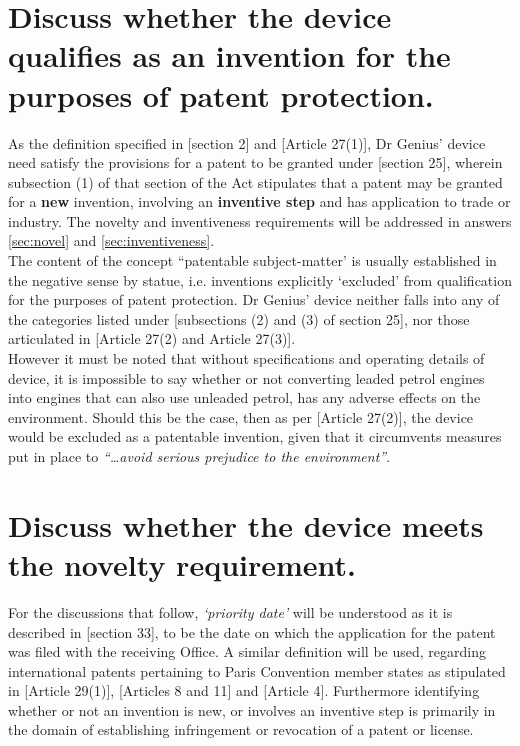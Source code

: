 \documentclass[11pt]{article}
\begin{document}
\section{Discuss whether the device qualifies as an invention for the purposes of patent protection.}
\label{sec:org565e61d}
\label{sec:invention}

As the definition specified in [section 2]\cite{rsa78_patents_act} and [Article 27(1)]\cite{wto17_trips}, Dr Genius' device need satisfy the provisions for a patent to be granted under [section 25]\cite{rsa78_patents_act}, wherein subsection (1) of that section of the Act stipulates that a patent may be granted for a \textbf{new} invention, involving an \textbf{inventive step} and has application to trade or industry. The novelty and inventiveness requirements will be addressed in answers \ref{sec:novel} and \ref{sec:inventiveness}.\\

The content of the concept ``patentable subject-matter' is usually established in the negative sense by statue, i.e. inventions explicitly `excluded' from qualification for the purposes of patent protection. Dr Genius' device neither falls into any of the categories listed under [subsections (2) and (3) of section 25]\cite{rsa78_patents_act}, nor those articulated in [Article 27(2) and Article 27(3)]\cite{wto17_trips}.\\

However it must be noted that without specifications and operating details of device, it is impossible to say whether or not converting leaded petrol engines into engines that can also use unleaded petrol, has any adverse effects on the environment. Should this be the case, then as per [Article 27(2)]\cite{wto17_trips}, the device would be excluded as a patentable invention, given that it circumvents measures put in place to \emph{``\ldots{}avoid serious prejudice to the environment''}.

\section{Discuss whether the device meets the novelty requirement.}
\label{sec:org131b1f6}
\label{sec:novel}

For the discussions that follow, \emph{`priority date'} will be understood as it is
described in [section 33]\cite{rsa78_patents_act}, to be the date on which the
application for the patent was filed with the receiving Office. A similar
definition will be used, regarding international patents pertaining to Paris
Convention member states as stipulated in [Article 29(1)]\cite{wto17_trips},
[Articles 8 and 11]\cite{wipo70_pct} and [Article 4]\cite{wipo83_paris_conve_protect_ip}. Furthermore identifying whether or not an invention is new, or involves an inventive step is primarily in the domain of establishing infringement or revocation of a patent or license.\\
\end{document}
